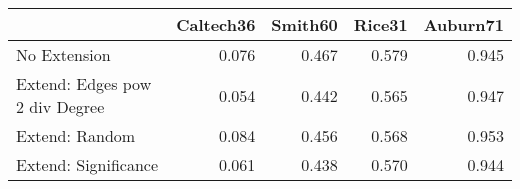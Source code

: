 \begin{tabular}{lrrrr}
\toprule
{} & Caltech36 & Smith60 & Rice31 & Auburn71 \\
\midrule
No Extension                   &     0.076 &   0.467 &  0.579 &    0.945 \\
Extend: Edges pow 2 div Degree &     0.054 &   0.442 &  0.565 &    0.947 \\
Extend: Random                 &     0.084 &   0.456 &  0.568 &    0.953 \\
Extend: Significance           &     0.061 &   0.438 &  0.570 &    0.944 \\
\bottomrule
\end{tabular}

